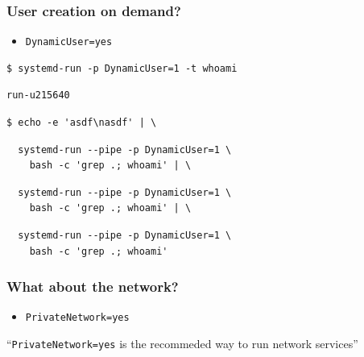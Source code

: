 \documentclass[serif]{beamer}
\begin{document}
\begin{frame}[fragile]
  \frametitle{User creation on demand?}
  \pause
  \begin{itemize}
  \item \texttt{DynamicUser=yes}
  \end{itemize}

  \pause

  \begin{verbatim}
$ systemd-run -p DynamicUser=1 -t whoami
  \end{verbatim}
\pause
  \begin{verbatim}
run-u215640
\end{verbatim}
  \pause

  \begin{verbatim}
$ echo -e 'asdf\nasdf' | \
  \end{verbatim}
  \pause
  \begin{verbatim}
  systemd-run --pipe -p DynamicUser=1 \
    bash -c 'grep .; whoami' | \
  \end{verbatim}
  \pause
  \begin{verbatim}
  systemd-run --pipe -p DynamicUser=1 \
    bash -c 'grep .; whoami' | \
  \end{verbatim}
  \pause
  \begin{verbatim}
  systemd-run --pipe -p DynamicUser=1 \
    bash -c 'grep .; whoami'
  \end{verbatim}
\end{frame}

\begin{frame}
  \frametitle{What about the network?}

  \pause

  \begin{itemize}
  \item \texttt{PrivateNetwork=yes}
  \end{itemize}

  \pause

  ``\texttt{PrivateNetwork=yes} is the recommeded way to run network services''
\end{frame}
\end{document}
